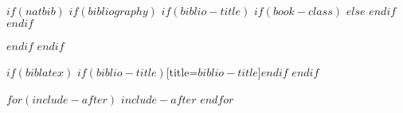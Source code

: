 \documentclass[doctor,twoside,chapterhead,otf]{znufethesis}
\begin{document}
\cleardoublepage
\pagestyle{emptypage}
\renewcommand{\chapterlabel}{\bibname}


$if(natbib)$
$if(bibliography)$
$if(biblio-title)$
$if(book-class)$
\renewcommand\bibname{$biblio-title$}
$else$
\renewcommand\refname{$biblio-title$}
$endif$
$endif$


$endif$
$endif$

$if(biblatex)$
\printbibliography$if(biblio-title)$[title=$biblio-title$]$endif$
$endif$

\ifodd\thepage
\blankpage
\fi

\appendix
\backmatter
\cleardoublepage
\pagestyle{appendixpage}
\renewcommand{\chapterlabel}{\appendixname} %




$for(include-after)$
$include-after$
$endfor$

\cleardoublepage
\renewcommand{\chapterlabel}{\ackname} %

\end{document}
